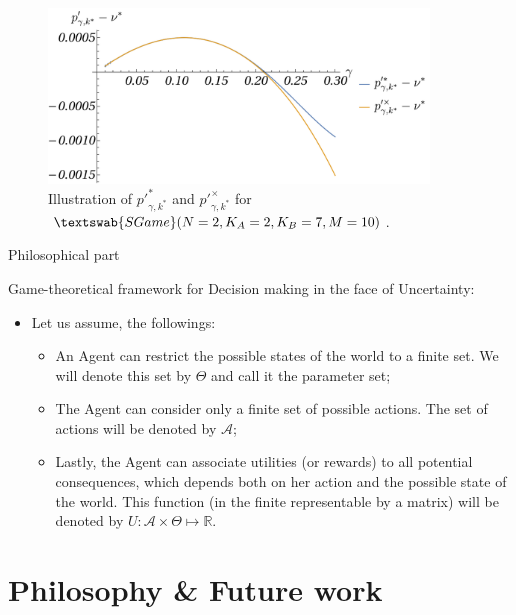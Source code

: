 \documentclass{beamer}
\theoremstyle{definition}
\newcommand{\SG}[1]{$\textswab{SGame}(#1)$}
\begin{document}
\begin{frame}{}

    \begin{figure}[H]
    \centering
    \includegraphics[width=0.9\textwidth]{img/AsymptoticExpasion_pp.pdf}
    \caption{\small \centering Illustration of $p'^*_{\gamma,k^*}$ and $p'^\times_{\gamma,k^*}$ for \SG{N=2,K_A=2,K_B=7,M=10}.}
    \label{fig:Asymptotic_pp}
\end{figure}

\end{frame}

\begin{frame}{Philosophical part }

Game-theoretical framework for Decision making in the face of Uncertainty:

\begin{itemize}
    \item Let us assume, the followings:
    \begin{itemize}
    \item An Agent can restrict the possible states of the world to a finite set. We will denote this set by $\Theta$ and call it the parameter set;
    \item The Agent can consider only a finite set of possible actions. The set of actions will be denoted by $\mathcal{A}$;
    \item Lastly, the Agent can associate utilities (or rewards) to all potential consequences, which depends both on her action and the possible state of the world. This function (in the finite representable by a matrix) will be denoted by $U: \mathcal{A} \times \Theta \mapsto \mathbb{R}$.
\end{itemize}
\end{itemize}

\end{frame}

\section{Philosophy \& Future work}
\end{document}
